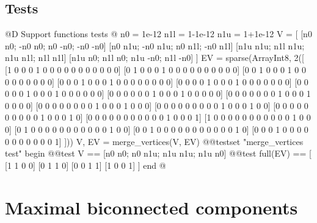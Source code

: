 \documentclass[10pt,oneside]{article}
\begin{document}
\subsection{Tests}
@D Support functions tests
@{
n0 = 1e-12
n1l = 1-1e-12
n1u = 1+1e-12
V = [
    [n0 n0; -n0 n0; n0 -n0; -n0 -n0]
    [n0 n1u; -n0 n1u; n0 n1l; -n0 n1l]
    [n1u n1u; n1l n1u; n1u n1l; n1l n1l]
    [n1u n0; n1l n0; n1u -n0; n1l -n0]
]
EV = sparse(Array{Int8, 2}([
    [1 0 0 0 1 0 0 0 0 0 0 0 0 0 0 0]
    [0 1 0 0 0 1 0 0 0 0 0 0 0 0 0 0]
    [0 0 1 0 0 0 1 0 0 0 0 0 0 0 0 0]
    [0 0 0 1 0 0 0 1 0 0 0 0 0 0 0 0]
    [0 0 0 0 1 0 0 0 1 0 0 0 0 0 0 0]
    [0 0 0 0 0 1 0 0 0 1 0 0 0 0 0 0]
    [0 0 0 0 0 0 1 0 0 0 1 0 0 0 0 0]
    [0 0 0 0 0 0 0 1 0 0 0 1 0 0 0 0]
    [0 0 0 0 0 0 0 0 1 0 0 0 1 0 0 0]
    [0 0 0 0 0 0 0 0 0 1 0 0 0 1 0 0]
    [0 0 0 0 0 0 0 0 0 0 1 0 0 0 1 0]
    [0 0 0 0 0 0 0 0 0 0 0 1 0 0 0 1]
    [1 0 0 0 0 0 0 0 0 0 0 0 1 0 0 0]
    [0 1 0 0 0 0 0 0 0 0 0 0 0 1 0 0]
    [0 0 1 0 0 0 0 0 0 0 0 0 0 0 1 0]
    [0 0 0 1 0 0 0 0 0 0 0 0 0 0 0 1]
]))
V, EV = merge_vertices(V, EV)
@@testset "merge_vertices test" begin
    @@test V == [n0 n0; n0 n1u; n1u n1u; n1u n0]
    @@test full(EV) == [
        [1 1 0 0]
        [0 1 1 0]
        [0 0 1 1]
        [1 0 0 1]
    ]
end
@}




\section{Maximal biconnected components}
\end{document}
